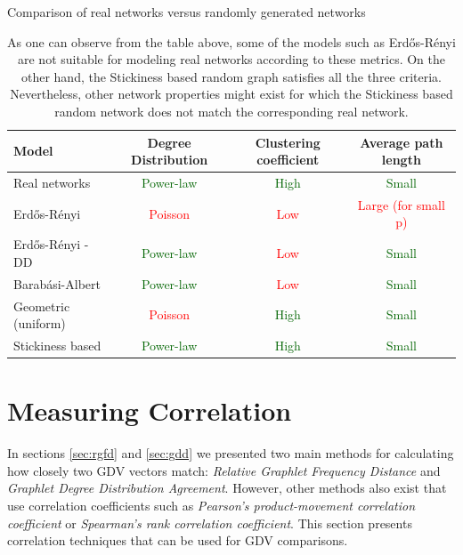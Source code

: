 \begin{table}
  \centering
  Comparison of real networks versus randomly generated networks 
  \begin{tabular}{ | l | c | c | c |  }
    \cellcolor{blue3} Model & \cellcolor{blue3} Degree Distribution &
  \cellcolor{blue3} Clustering coefficient & \cellcolor{blue3} Average path
length \\
    \hline
    Real networks & \textcolor{darkgreen}{Power-law} &
  \textcolor{darkgreen}{High} & \textcolor{darkgreen}{Small}\\
    \hline
    Erd\H{o}s-R\'{e}nyi & \textcolor{red}{Poisson} & \textcolor{red}{Low} &
  \textcolor{red}{Large (for small p)} \\
    \hline
    Erd\H{o}s-R\'{e}nyi - DD & \textcolor{darkgreen}{Power-law} &
  \textcolor{red}{Low} & \textcolor{darkgreen}{Small} \\
    \hline
    Barab\'{a}si-Albert & \textcolor{darkgreen}{Power-law} &
  \textcolor{red}{Low} & \textcolor{darkgreen}{Small} \\
    \hline
    Geometric (uniform) & \textcolor{red}{Poisson} &
  \textcolor{darkgreen}{High} & \textcolor{darkgreen}{Small} \\
    \hline
    Stickiness based & \textcolor{darkgreen}{Power-law} &
  \textcolor{darkgreen}{High} & \textcolor{darkgreen}{Small} \\
    \hline
  \end{tabular}
  \caption{As one can observe from the table above, some of the models
such as Erd\H{o}s-R\'{e}nyi are not suitable for modeling real networks according to
these metrics. On the other hand, the Stickiness based random graph satisfies all the three criteria. Nevertheless, other network properties might exist for which the Stickiness based random network does not match the corresponding real network.}
  \label{tab:network_comparison}
\end{table}

\section{Measuring Correlation}

In sections \ref{sec:rgfd} and \ref{sec:gdd} we presented two main methods for calculating
how closely two GDV vectors match: \emph{Relative Graphlet Frequency Distance}
 and \emph{Graphlet Degree Distribution Agreement}. However, other methods also exist that use correlation coefficients such as \emph{Pearson's product-movement correlation coefficient} or \emph{Spearman's rank correlation coefficient}. This section presents correlation techniques that can be used for GDV comparisons.

